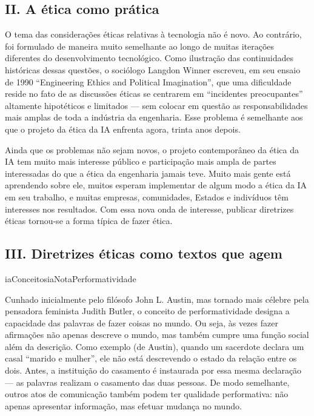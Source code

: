 \documentclass[
  11pt,
]{article}
\newenvironment{nota}[1][Nota]{\begin{iabox}{iaConceitos}{iaNota}{#1}}{\end{iabox}}
\begin{document}
\subsection{II. A ética como
prática}\label{ii.-a-uxe9tica-como-pruxe1tica}

O tema das considerações éticas relativas à tecnologia não é novo. Ao
contrário, foi formulado de maneira muito semelhante ao longo de muitas
iterações diferentes do desenvolvimento tecnológico. Como ilustração das
continuidades históricas dessas questões, o sociólogo Langdon Winner
escreveu, em seu ensaio de 1990 ``Engineering Ethics and Political
Imagination'', que uma dificuldade reside no fato de as discussões
éticas se centrarem em ``incidentes preocupantes'' altamente hipotéticos
e limitados --- sem colocar em questão as responsabilidades mais amplas
de toda a indústria da engenharia. Esse problema é semelhante aos que o
projeto da ética da IA enfrenta agora, trinta anos depois.

Ainda que os problemas não sejam novos, o projeto contemporâneo da ética
da IA tem muito mais interesse público e participação mais ampla de
partes interessadas do que a ética da engenharia jamais teve. Muito mais
gente está aprendendo sobre ele, muitos esperam implementar de algum
modo a ética da IA em seu trabalho, e muitas empresas, comunidades,
Estados e indivíduos têm interesses nos resultados. Com essa nova onda
de interesse, publicar diretrizes éticas tornou-se a forma típica de
fazer ética.

\subsection{III. Diretrizes éticas como textos que
agem}\label{iii.-diretrizes-uxe9ticas-como-textos-que-agem}

\begin{nota}[Performatividade]

Cunhado inicialmente pelo filósofo John L. Austin, mas tornado mais
célebre pela pensadora feminista Judith Butler, o conceito de
performatividade designa a capacidade das palavras de fazer coisas no
mundo. Ou seja, às vezes fazer afirmações não apenas descreve o mundo,
mas também cumpre uma função social além da descrição. Como exemplo (de
Austin), quando um sacerdote declara um casal ``marido e mulher'', ele
não está descrevendo o estado da relação entre os dois. Antes, a
instituição do casamento é instaurada por essa mesma declaração --- as
palavras realizam o casamento das duas pessoas. De modo semelhante,
outros atos de comunicação também podem ter qualidade performativa: não
apenas apresentar informação, mas efetuar mudança no mundo.

\end{nota}
\end{document}
